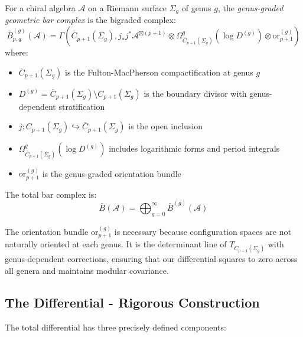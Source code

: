 \begin{definition}\label{def:geom-bar}
For a chiral algebra $\mathcal{A}$ on a Riemann surface $\Sigma_g$ of genus $g$, the \emph{genus-graded geometric bar complex} is the bigraded complex:
\[
\bar{B}^{(g)}_{p,q}(\mathcal{A}) = \Gamma\left(\overline{C}_{p+1}(\Sigma_g), j_*j^*\mathcal{A}^{\boxtimes(p+1)} \otimes \Omega^q_{\overline{C}_{p+1}(\Sigma_g)}(\log D^{(g)}) \otimes \text{or}_{p+1}^{(g)}\right)
\]
where:
\begin{itemize}
\item $\overline{C}_{p+1}(\Sigma_g)$ is the Fulton-MacPherson compactification at genus $g$
\item $D^{(g)} = \overline{C}_{p+1}(\Sigma_g) \setminus C_{p+1}(\Sigma_g)$ is the boundary divisor with genus-dependent stratification
\item $j: C_{p+1}(\Sigma_g) \hookrightarrow \overline{C}_{p+1}(\Sigma_g)$ is the open inclusion
\item $\Omega^q_{\overline{C}_{p+1}(\Sigma_g)}(\log D^{(g)})$ includes logarithmic forms and period integrals
\item $\text{or}_{p+1}^{(g)}$ is the genus-graded orientation bundle
\end{itemize}

The total bar complex is:
$$\bar{B}(\mathcal{A}) = \bigoplus_{g=0}^{\infty} \bar{B}^{(g)}(\mathcal{A})$$
\end{definition}
 
\begin{remark}
The orientation bundle $\text{or}_{p+1}^{(g)}$ is necessary because configuration spaces are not naturally 
oriented at each genus. It is the determinant line of $T_{C_{p+1}(\Sigma_g)}$ with genus-dependent corrections, ensuring that our differential squares to zero across all genera and maintains modular covariance.
\end{remark}
 
\subsection{The Differential - Rigorous Construction}
 
The total differential has three precisely defined components:
 
